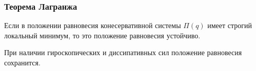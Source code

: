\subsubsection*{Теорема Лагранжа}

\begin{to_thr}
     Если в положении равновесия конесервативной системы $\Pi(q)$ имеет строгий локальный минимум, то это положение равновесия устойчиво.
\end{to_thr}

\begin{to_lem} 
    При наличии гироскопических и диссипативных сил положение равновесия сохранится. 
\end{to_lem}



